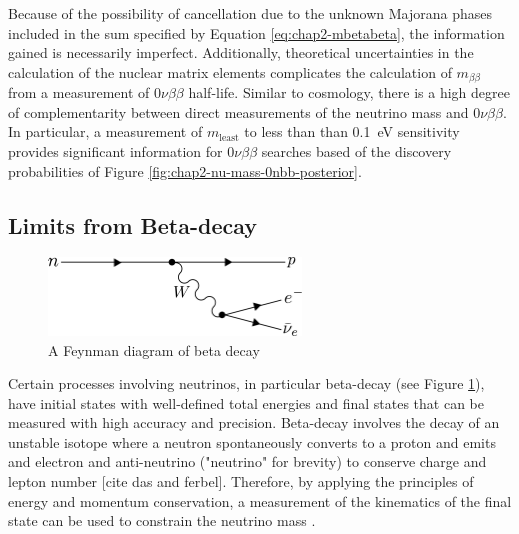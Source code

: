 Because of the possibility of cancellation due to the unknown Majorana phases included in the sum specified by Equation \ref{eq:chap2-mbetabeta}, the information gained is necessarily imperfect. Additionally, theoretical uncertainties in the calculation of the nuclear matrix elements complicates the calculation of $m_{\beta\beta}$ from a measurement of $0\nu\beta\beta$ half-life. Similar to cosmology, there is a high degree of complementarity between direct measurements of the neutrino mass and $0\nu\beta\beta$. In particular, a measurement of $m_\textrm{least}$ to less than than 0.1~eV sensitivity provides significant information for $0\nu\beta\beta$ searches based of the discovery probabilities of Figure \ref{fig:chap2-nu-mass-0nbb-posterior}.


\subsection{Limits from Beta-decay}

\begin{figure}[htbp]
    \centering
    \includegraphics*[width=0.6\textwidth]{figs/Chapter-2/230717_betadecay.png}
    \caption{\label{fig:chap2-beta-decay-diagram} A Feynman diagram of beta decay}
\end{figure}

Certain processes involving neutrinos, in particular beta-decay (see Figure \ref{fig:chap2-beta-decay-diagram}), have initial states with well-defined total energies and final states that can be measured with high accuracy and precision. Beta-decay involves the decay of an unstable isotope where a neutron spontaneously converts to a proton and emits and electron and anti-neutrino ("neutrino" for brevity) to conserve charge and lepton number [cite das and ferbel]. Therefore, by applying the principles of energy and momentum conservation, a measurement of the kinematics of the final state can be used to constrain the neutrino mass \cite{FORMAGGIO20211}. 

